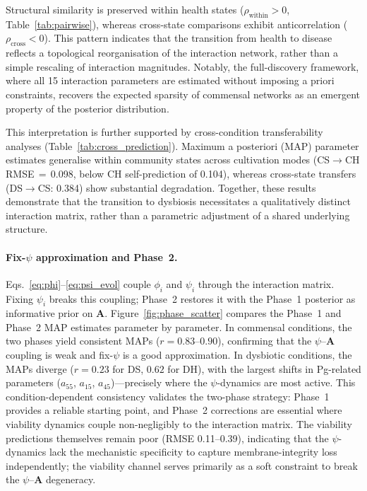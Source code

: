 \documentclass[11pt,a4paper]{article}
\begin{document}
Structural similarity is preserved within health states ($\rho_{\text{within}}>0$, Table~\ref{tab:pairwise}), whereas cross-state comparisons exhibit anticorrelation ($\rho_{\text{cross}}<0$). 
This pattern indicates that the transition from health to disease reflects a topological reorganisation of the interaction network, rather than a simple rescaling of interaction magnitudes. Notably, the full-discovery framework, where all 15 interaction parameters are estimated without imposing a priori constraints, recovers the expected sparsity of commensal networks as an emergent property of the posterior distribution.

This interpretation is further supported by cross-condition transferability analyses (Table~\ref{tab:cross_prediction}). Maximum a posteriori (MAP) parameter estimates generalise within community states across cultivation modes (CS$\to$CH RMSE\,$=$\,0.098, below CH self-prediction of 0.104), whereas cross-state transfers (DS$\to$CS: 0.384) show substantial degradation. Together, these results demonstrate that the transition to dysbiosis necessitates a qualitatively distinct interaction matrix, rather than a parametric adjustment of a shared underlying structure.

\paragraph{Fix-$\psi$ approximation and Phase~2.}
Eqs.~\eqref{eq:phi}--\eqref{eq:psi_evol} couple $\phi_i$ and $\psi_i$ through the interaction matrix.
Fixing $\psi_i$ breaks this coupling; Phase~2 restores it with the Phase~1 posterior as informative prior on $\mathbf{A}$.
Figure~\ref{fig:phase_scatter} compares the Phase~1 and Phase~2 MAP estimates parameter by parameter.
In commensal conditions, the two phases yield consistent MAPs ($r=0.83$--$0.90$), confirming that the $\psi$--$\mathbf{A}$ coupling is weak and fix-$\psi$ is a good approximation.
In dysbiotic conditions, the MAPs diverge ($r=0.23$ for DS, $0.62$ for DH), with the largest shifts in Pg-related parameters ($a_{55}$, $a_{15}$, $a_{45}$)---precisely where the $\psi$-dynamics are most active.
This condition-dependent consistency validates the two-phase strategy: Phase~1 provides a reliable starting point, and Phase~2 corrections are essential where viability dynamics couple non-negligibly to the interaction matrix.
The viability predictions themselves remain poor (RMSE 0.11--0.39), indicating that the $\psi$-dynamics lack the mechanistic specificity to capture membrane-integrity loss independently; the viability channel serves primarily as a soft constraint to break the $\psi$--$\mathbf{A}$ degeneracy.
\end{document}

